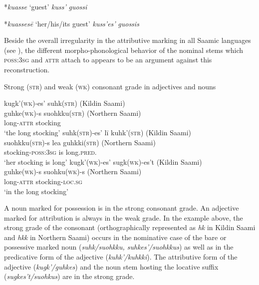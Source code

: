 {\begin{exe}
\ex
\begin{xlist}
\ex
\begin{xlist}
	*\textit{kuasse} ‘guest’
	\textit{kuss'}
 \textit{guossi}
\end{xlist}
\ex
\begin{xlist}
	*\textit{kuassesē} ‘her/his/its guest’
	\textit{kuss'es'}
 \textit{guossis}
\end{xlist}
\end{xlist}
\end{exe}
Beside the overall irregularity in the attributive marking in all Saamic languages (see ), the different morpho-phonological behavior of the nominal stems which \textsc{poss:3sg} and \textsc{attr} attach to appears to be an argument against this reconstruction. 

\begin{exe}
\ex Strong (\textsc{str}) and weak (\textsc{wk}) consonant grade in adjectives and nouns
\begin{xlist}
\ex 
\glll 	kugk'(\textsc{wk})-es' suhk(\textsc{str}) {(Kildin Saami)} \\
	guhke(\textsc{wk})-s suohkku(\textsc{str}) {(Northern Saami)}\\
	long-\textsc{attr} stocking\\
\glt	‘the long stocking’
\ex 
\glll	suhk(\textsc{str})-es' lī kuhk'(\textsc{str}) {(Kildin Saami)}\\
	suohkku(\textsc{str})-s lea guhkki(\textsc{str}) {(Northern Saami)}\\
	stocking-\textsc{poss:3sg} is long.\textsc{pred.}\\
\glt	‘her stocking is long’
\ex
\glll	kugk'(\textsc{wk})-es' sugk(\textsc{wk})-es't {(Kildin Saami)}\\
	guhke(\textsc{wk})-s suohku(\textsc{wk})-s {(Northern Saami)}\\
	long-\textsc{attr} stocking-\textsc{loc.sg}\\
\glt	‘in the long stocking’
\end{xlist}
\end{exe}
A noun marked for possession is in the strong consonant grade. An adjective marked for attribution is always in the weak grade. In the example above, the strong grade of the consonant (orthographically represented as \textit{hk} in Kildin Saami and \textit{hkk} in Northern Saami) occurs in the nominative case of the bare or possessive marked noun (\textit{suhk/suohkku, suhkes'/suohkkus}) as well as in the predicative form of the adjective (\textit{kuhk'/kuhkki}). The attributive form of the adjective (\textit{kugk'/guhkes}) and the noun stem hosting the locative suffix (\textit{sugkes't/suohkus}) are in the strong grade.

}
